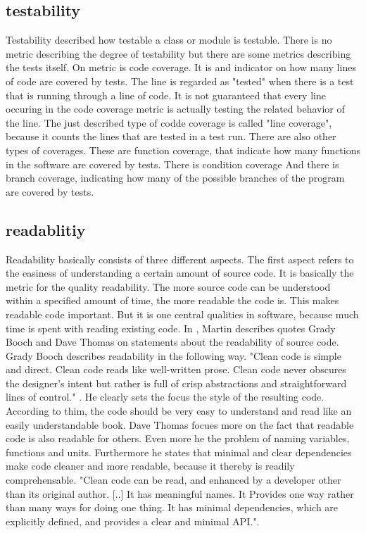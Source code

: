 \subsection{testability}
Testability described how testable a class or module is testable. There is no metric describing the degree of testability but there are some metrics describing the tests itself. 
On metric is code coverage. It is and indicator on how many lines of code are covered by tests. The line is regarded as "tested" when there is a test that is running through a line of code. It is not guaranteed that every line occuring in the code coverage metric is actually testing the related behavior of the line. 
The just described type of codde coverage is called "line coverage", because it counts the lines that are tested in a test run. There are also other types of coverages. These are function coverage, that indicate how many functions in the software are covered by tests. There is condition coverage %
And there is branch coverage, indicating how many of the possible branches of the program are covered by tests. 

\subsection{readablitiy}
Readability basically consists of three different aspects. 
The first aspect refers to the easiness of understanding a certain amount of source code. It is basically the metric for the quality readability.  The more source code can be understood within a specified amount of time, the more readable the code is. This makes readable code important. But it is one central qualities in software, because much time is spent with reading existing code. In \cite{cc}, Martin describes quotes Grady Booch and Dave Thomas on statements about the readability of source code. Grady Booch describes readability in the following way. "Clean code is simple and direct. Clean code reads like well-written prose. Clean code never obscures the designer’s intent but rather is full of crisp abstractions and straightforward lines of control." \cite[p. 8]{cc}. He clearly sets the focus the style of the resulting code. According to thim, the code should be very easy to understand and read like an easily understandable book. Dave Thomas focues more on the fact that readable code is also readable for others. Even more he the problem of naming variables, functions and units. Furthermore he states that minimal and clear dependencies make code cleaner and more readable, because it thereby is readily comprehensable. "Clean code can be read, and enhanced by a developer other than its original author. [..] It has meaningful names. It  Provides one way rather than many ways for doing one thing. It has minimal dependencies, which are explicitly defined, and provides a clear and minimal  API."\cite[p. 9]{cc}. \\

